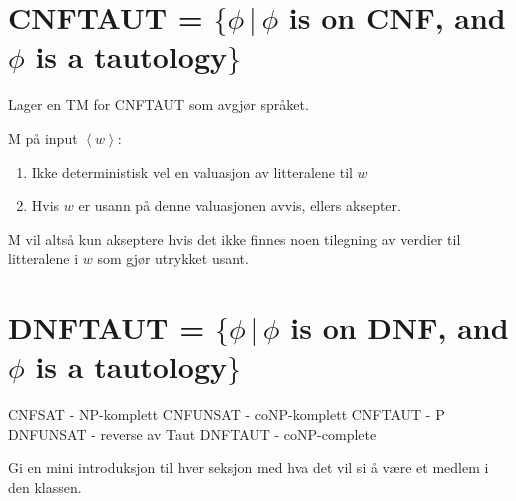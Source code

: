 \documentclass{article}
\begin{document}
\section{CNFTAUT = $\{\phi \, |  \, \phi $ is on CNF, and $\phi$ is a tautology$\}$}

Lager en TM for CNFTAUT som avgjør språket.

M på input $\left<w\right>$:
\begin{enumerate}
\item Ikke deterministisk vel en valuasjon av litteralene til $w$
\item Hvis $w$ er usann på denne valuasjonen avvis, ellers aksepter.
\end{enumerate}

M vil altså kun akseptere hvis det ikke finnes noen tilegning av verdier til litteralene i $w$ som gjør utrykket usant.



\section{DNFTAUT = $\{\phi \, |  \, \phi $ is on DNF, and $\phi$ is a tautology$\}$}




CNFSAT   - NP-komplett
CNFUNSAT - coNP-komplett
CNFTAUT  - P
DNFUNSAT - reverse av Taut
DNFTAUT  - coNP-complete


Gi en mini introduksjon til hver seksjon med hva det vil si å være et medlem i den klassen. 
\end{document}
